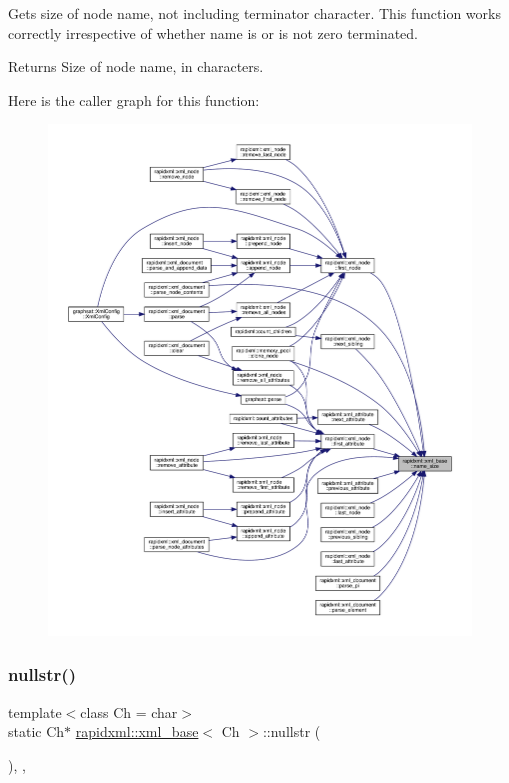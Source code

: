 Gets size of node name, not including terminator character. This function works correctly irrespective of whether name is or is not zero terminated. \begin{DoxyReturn}{Returns}
Size of node name, in characters. 
\end{DoxyReturn}
Here is the caller graph for this function\+:\nopagebreak
\begin{figure}[H]
\begin{center}
\leavevmode
\includegraphics[width=350pt]{classrapidxml_1_1xml__base_a20c8ffbe0c7a0b4231681ab8b99330a4_icgraph}
\end{center}
\end{figure}
\mbox{\label{classrapidxml_1_1xml__base_ad96ff6b1e41dab3ff60b9bc4df769a75}} 
\subsubsection{\texorpdfstring{nullstr()}{nullstr()}}
{\footnotesize\ttfamily template$<$class Ch  = char$>$ \\
static Ch$\ast$ \mbox{\hyperlink{classrapidxml_1_1xml__base}{rapidxml\+::xml\+\_\+base}}$<$ Ch $>$\+::nullstr (\begin{DoxyParamCaption}{ }\end{DoxyParamCaption})\hspace{0.3cm}{\ttfamily [inline]}, {\ttfamily [static]}, {\ttfamily [protected]}}


